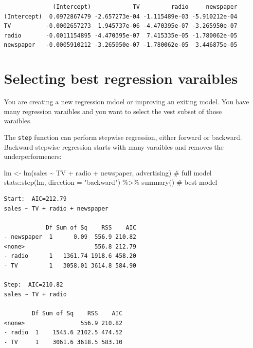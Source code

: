 \documentclass[
  letterpaper,
  DIV=11,
  numbers=noendperiod]{scrreprt}
\newenvironment{Shaded}{\begin{snugshade}}{\end{snugshade}}
\newcommand{\AttributeTok}[1]{\textcolor[rgb]{0.65,0.35,0.00}{#1}}
\newcommand{\CommentTok}[1]{\textcolor[rgb]{0.41,0.41,0.41}{#1}}
\newcommand{\FunctionTok}[1]{\textcolor[rgb]{0.02,0.16,0.49}{#1}}
\newcommand{\NormalTok}[1]{\textcolor[rgb]{0.33,0.33,0.33}{#1}}
\newcommand{\OtherTok}[1]{\textcolor[rgb]{0.85,0.12,0.09}{#1}}
\newcommand{\SpecialCharTok}[1]{\textcolor[rgb]{0.00,0.46,0.62}{#1}}
\newcommand{\StringTok}[1]{\textcolor[rgb]{0.00,0.50,0.00}{#1}}
\begin{document}
\begin{verbatim}
              (Intercept)            TV         radio     newspaper
(Intercept)  0.0972867479 -2.657273e-04 -1.115489e-03 -5.910212e-04
TV          -0.0002657273  1.945737e-06 -4.470395e-07 -3.265950e-07
radio       -0.0011154895 -4.470395e-07  7.415335e-05 -1.780062e-05
newspaper   -0.0005910212 -3.265950e-07 -1.780062e-05  3.446875e-05
\end{verbatim}


\hypertarget{selecting-best-regression-varaibles}{%
\chapter{Selecting best regression
varaibles}\label{selecting-best-regression-varaibles}}

You are creating a new regression mdoel or improving an exiting model.
You have many regression varaibles and you want to select the vest
subset of those varaibles.

The \texttt{step} function can perform stepwise regression, either
forward or backward. Backward stepwise regression starts with many
varaibles and removes the underperformeners:

\begin{Shaded}
\begin{Highlighting}[]
\NormalTok{lm }\OtherTok{\textless{}{-}} \FunctionTok{lm}\NormalTok{(sales }\SpecialCharTok{\textasciitilde{}}\NormalTok{ TV }\SpecialCharTok{+}\NormalTok{ radio }\SpecialCharTok{+}\NormalTok{ newspaper, advertising) }\CommentTok{\# full model}
\NormalTok{stats}\SpecialCharTok{::}\FunctionTok{step}\NormalTok{(lm, }\AttributeTok{direction =} \StringTok{"backward"}\NormalTok{) }\SpecialCharTok{\%\textgreater{}\%} \FunctionTok{summary}\NormalTok{() }\CommentTok{\# best model}
\end{Highlighting}
\end{Shaded}

\begin{verbatim}
Start:  AIC=212.79
sales ~ TV + radio + newspaper

            Df Sum of Sq    RSS    AIC
- newspaper  1      0.09  556.9 210.82
<none>                    556.8 212.79
- radio      1   1361.74 1918.6 458.20
- TV         1   3058.01 3614.8 584.90

Step:  AIC=210.82
sales ~ TV + radio

        Df Sum of Sq    RSS    AIC
<none>                556.9 210.82
- radio  1    1545.6 2102.5 474.52
- TV     1    3061.6 3618.5 583.10
\end{verbatim}
\end{document}

